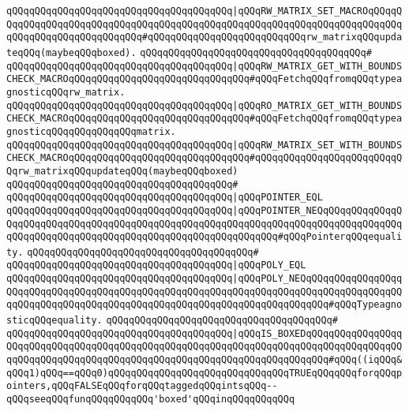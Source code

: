 \verb|qQQqqQQqqQQqqQQqqQQqqQQqqQQqqQQqqQQqqQQq|\verb#|qQQqRW_MATRIX_SET_MACROqQQqqQQqqQQqqQQqqQQqqQQqqQQqqQQqqQQqqQQqqQQqqQQqqQQqqQQqqQQqqQQqqQQqqQQqqQQqqQQqqQQqqQQqqQQqqQQqqQQq#\verb|#qQQqqQQqqQQqqQQqqQQqqQQqqQQqrw_matrixqQQqupdateqQQq(maybeqQQqboxed).|\newline
\verb|qQQqqQQqqQQqqQQqqQQqqQQqqQQqqQQqqQQqqQQq#|\newline
\verb|qQQqqQQqqQQqqQQqqQQqqQQqqQQqqQQqqQQqqQQq|\verb#|qQQqRW_MATRIX_GET_WITH_BOUNDSCHECK_MACROqQQqqQQqqQQqqQQqqQQqqQQqqQQqqQQq#\verb|#qQQqFetchqQQqfromqQQqtypeagnosticqQQqrw_matrix.|\newline
\verb|qQQqqQQqqQQqqQQqqQQqqQQqqQQqqQQqqQQqqQQq|\verb#|qQQqRO_MATRIX_GET_WITH_BOUNDSCHECK_MACROqQQqqQQqqQQqqQQqqQQqqQQqqQQqqQQq#\verb|#qQQqFetchqQQqfromqQQqtypeagnosticqQQqqQQqqQQqqQQqmatrix.|\newline
\verb|qQQqqQQqqQQqqQQqqQQqqQQqqQQqqQQqqQQqqQQq|\verb#|qQQqRW_MATRIX_SET_WITH_BOUNDSCHECK_MACROqQQqqQQqqQQqqQQqqQQqqQQqqQQqqQQq#\verb|#qQQqqQQqqQQqqQQqqQQqqQQqqQQqrw_matrixqQQqupdateqQQq(maybeqQQqboxed)|\newline
\verb|qQQqqQQqqQQqqQQqqQQqqQQqqQQqqQQqqQQqqQQq#|\newline
\verb|qQQqqQQqqQQqqQQqqQQqqQQqqQQqqQQqqQQqqQQq|\verb#|qQQqPOINTER_EQL#\newline
\verb|qQQqqQQqqQQqqQQqqQQqqQQqqQQqqQQqqQQqqQQq|\verb#|qQQqPOINTER_NEQqQQqqQQqqQQqqQQqqQQqqQQqqQQqqQQqqQQqqQQqqQQqqQQqqQQqqQQqqQQqqQQqqQQqqQQqqQQqqQQqqQQqqQQqqQQqqQQqqQQqqQQqqQQqqQQqqQQqqQQqqQQqqQQqqQQq#\verb|#qQQqPointerqQQqequality.|\newline
\verb|qQQqqQQqqQQqqQQqqQQqqQQqqQQqqQQqqQQqqQQq#|\newline
\verb|qQQqqQQqqQQqqQQqqQQqqQQqqQQqqQQqqQQqqQQq|\verb#|qQQqPOLY_EQL#\newline
\verb|qQQqqQQqqQQqqQQqqQQqqQQqqQQqqQQqqQQqqQQq|\verb#|qQQqPOLY_NEQqQQqqQQqqQQqqQQqqQQqqQQqqQQqqQQqqQQqqQQqqQQqqQQqqQQqqQQqqQQqqQQqqQQqqQQqqQQqqQQqqQQqqQQqqQQqqQQqqQQqqQQqqQQqqQQqqQQqqQQqqQQqqQQqqQQqqQQqqQQqqQQq#\verb|#qQQqTypeagnosticqQQqequality.|\newline
\verb|qQQqqQQqqQQqqQQqqQQqqQQqqQQqqQQqqQQqqQQq#|\newline
\verb|qQQqqQQqqQQqqQQqqQQqqQQqqQQqqQQqqQQqqQQq|\verb#|qQQqIS_BOXEDqQQqqQQqqQQqqQQqqQQqqQQqqQQqqQQqqQQqqQQqqQQqqQQqqQQqqQQqqQQqqQQqqQQqqQQqqQQqqQQqqQQqqQQqqQQqqQQqqQQqqQQqqQQqqQQqqQQqqQQqqQQqqQQqqQQqqQQqqQQqqQQq#\verb|#qQQq((iqQQq&qQQq1)qQQq==qQQq0)qQQqqQQqqQQqqQQqqQQqqQQqqQQqqQQqTRUEqQQqqQQqforqQQqpointers,qQQqFALSEqQQqforqQQqtaggedqQQqintsqQQq--qQQqseeqQQqfunqQQqqQQqqQQq'boxed'qQQqinqQQqqQQqqQQq|\newline
